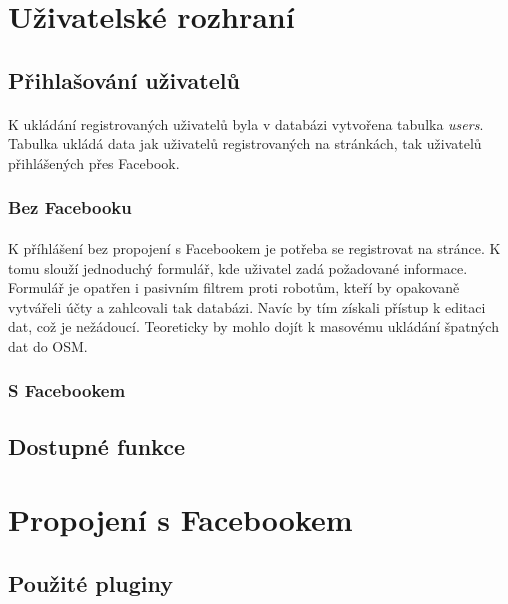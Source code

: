 \documentclass[11pt,a4paper,titlepage,oneside]{book}
\begin{document}
			
		\section{Uživatelské rozhraní}
			\subsection{Přihlašování uživatelů}
				\paragraph{}K ukládání registrovaných uživatelů byla v databázi vytvořena tabulka \textit{users}. Tabulka ukládá data jak uživatelů registrovaných na stránkách, tak uživatelů přihlášených přes Facebook.
				\subsubsection{Bez Facebooku}
					\paragraph{} K příhlášení bez propojení s Facebookem je potřeba se registrovat na stránce. K tomu slouží jednoduchý formulář, kde uživatel zadá požadované informace. Formulář je opatřen i pasivním filtrem proti robotům, kteří by opakovaně vytvářeli účty a zahlcovali tak databázi. Navíc by tím získali přístup k editaci dat, což je nežádoucí. Teoreticky by mohlo dojít k masovému ukládání špatných dat do OSM. 
				\subsubsection{S Facebookem}
					\paragraph{} 
			\subsection{Dostupné funkce}
				\paragraph{}

		\section{Propojení s Facebookem}
			\subsection{Použité pluginy}
\end{document}
